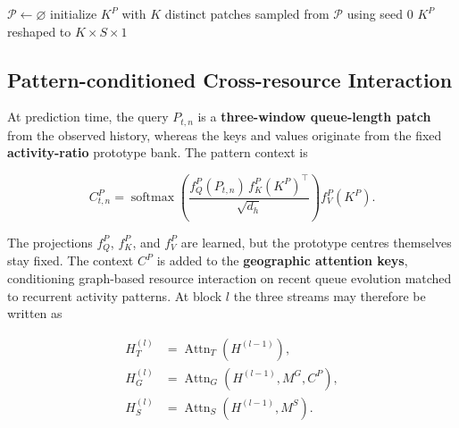 \begin{algorithm}[p]
\singlespacing
\footnotesize
\SetAlFnt{\footnotesize}
\SetAlCapFnt{\small}
\SetAlCapNameFnt{\small\bfseries}
\SetInd{0.5em}{0.8em}
\caption{Training-only temporal pattern clustering.}
\label{alg:pattern-bank}
$\mathcal{P}\leftarrow\varnothing$\;
initialize $K^P$ with $K$ distinct patches sampled from $\mathcal{P}$ using seed $0$\;
\Return $K^P$ reshaped to $K\times S\times1$\;
\end{algorithm}
\FloatBarrier

\subsection{Pattern-conditioned Cross-resource Interaction}\label{pattern-conditioned-cross-resource-interaction}

At prediction time, the query \(P_{t,n}\) is a \textbf{three-window queue-length patch} from the observed history, whereas the keys and values originate from the fixed \textbf{activity-ratio} prototype bank. The pattern context is

\[
C^P_{t,n}=\operatorname{softmax}\!\left(
\frac{f_Q^P(P_{t,n})\,f_K^P(K^P)^{\top}}{\sqrt{d_h}}
\right)f_V^P(K^P).
\]

The projections \(f_Q^P\), \(f_K^P\), and \(f_V^P\) are learned, but the prototype centres themselves stay fixed. The context \(C^P\) is added to the \textbf{geographic attention keys}, conditioning graph-based resource interaction on recent queue evolution matched to recurrent activity patterns. At block \(l\) the three streams may therefore be written as

\[
\begin{aligned}
H_T^{(l)}&=\operatorname{Attn}_T(H^{(l-1)}),\\
H_G^{(l)}&=\operatorname{Attn}_G(H^{(l-1)},M^G,C^P),\\
H_S^{(l)}&=\operatorname{Attn}_S(H^{(l-1)},M^S).
\end{aligned}
\]

